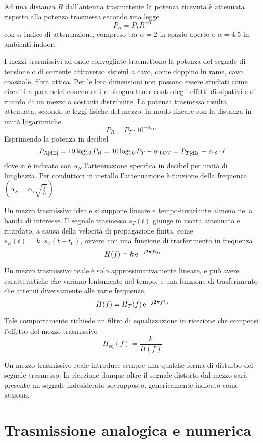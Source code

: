 Ad una distanza $R$ dall'antenna trasmittente la potenza ricevuta è attenuata rispetto alla potenza trasmessa secondo una legge
\begin{equation}
P_R=P_T R^{-\alpha}
\end{equation}
con $\alpha$ indice di attenuazione, compreso tra $\alpha=2$ in spazio aperto e $\alpha=4.5$ in ambienti indoor.

I mezzi trasmissivi ad onde convogliate trasmettono la potenza del segnale di tensione o di corrente attraverso sistemi a cavo, come doppino in rame, cavo coassiale, fibra ottica. Per le loro dimensioni non possono essere studiati come circuiti a parametri concentrati e bisogna tener conto degli effetti dissipativi e di ritardo di un mezzo a costanti distribuite. 
La potenza trasmessa risulta attenuata, secondo le leggi fisiche del mezzo, in modo lineare con la distanza in unità logaritmiche
\begin{equation}
P_R=P_T\cdot{10}^{-\alpha_\text{TOT}}
\end{equation}
Esprimendo la potenza in decibel
\[P_{R\text{[dB]}}=10\operatorname{log_{10}} P_R=10\operatorname{log_{10}} P_T-\alpha_\text{TOT}=P_{T\text{[dB]}}-\alpha_S\cdot\ell \]
dove si è indicato con $\alpha_S$ l'attenuazione specifica in decibel per unità di lunghezza. Per conduttori in metallo l'attenuazione è funzione della frequenza $\left(\alpha_S=\alpha_\text{r}\sqrt{\frac{f}{f_r}}\right)$.

Un mezzo trasmissivo ideale si suppone lineare e tempo-invariante almeno nella banda di interesse. Il segnale trasmesso $s_T(t)$ giunge in uscita attenuato e ritardato, a causa della velocità di propagazione finita, come $s_R(t)=k\cdot s_T(t-t_0)$, ovvero con una funzione di trasferimento in frequenza \[H(f)=k\operatorname{e}^{-\operatorname{\mathit{j}\!} 2\pi f t_0}\]

Un mezzo trasmissivo reale è solo approssimativamente lineare, e può avere caratteristiche che variano lentamente nel tempo, e una funzione di trasferimento che attenui diversamente alle varie frequenze, \[H(f)=H_T(f)\operatorname{e}^{-\operatorname{\mathit{j}\!} 2\pi f t_0}\]

Tale comportamento richiede un filtro di equalizzazione in ricezione che compensi l'effetto del mezzo trasmissivo \[H_\text{eq}(f)=\frac{k}{H(f)}\]

Un mezzo trasmissivo reale introduce sempre una qualche forma di disturbo del segnale trasmesso. In ricezione dunque oltre il segnale distorto dal mezzo sarà presente un segnale indesiderato sovrapposto, genericamente indicato come \textsc{rumore}.

\section{Trasmissione analogica e numerica}

